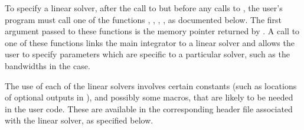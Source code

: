 To specify a {\cvodes} linear solver, after the call to 
but before any calls to , the user's program must call one
of the functions , , , ,
as documented below. The first argument passed to these functions is the {\cvodes}
memory pointer returned by .  A call to one of these
functions links the main {\cvodes} integrator to a linear solver and
allows the user to specify parameters which are specific to a
particular solver, such as the bandwidths in the {\cvband} case.

The use of each of the linear solvers involves certain constants (such
as locations of optional outputs in ), and possibly some
macros, that are likely to be needed in the user code.  These are
available in the corresponding header file associated with the linear
solver, as specified below.

